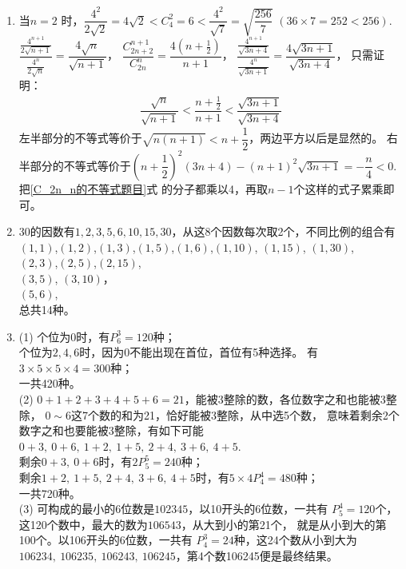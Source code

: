 \begin{enumerate}[label={\textbf{\arabic*.}},leftmargin=
    \inteval{\myenumleftmargin}pt]
\item 当$ n=2 $ 时，$ \dfrac{4^2}{2\sqrt{2}}=4\sqrt{2}<
C_4^2=6<\dfrac{4^2}{\sqrt{7}}=\sqrt{\dfrac{256}{7}} $\q 
$ (36\times 7=252<256) $. \\
$ \dfrac{\frac{4^{n+1}}{2\sqrt{n+1}}}
{\frac{4^{n}}{2\sqrt{n}}}=\dfrac{4\sqrt{n}}{\sqrt{n+1}} $，
$ \dfrac{C_{2n+2}^{n+1}}{C_{2n}^{n}}=
\dfrac{4(n+\frac{1}{2})}{n+1} $，
$ \dfrac{\frac{4^{n+1}}{\sqrt{3n+4}}}
{\frac{4^{n}}{\sqrt{3n+1}}}=\dfrac{4\sqrt{3n+1}}{\sqrt{3n+4}} $，
只需证明：
\begin{gather}\label{C_2n_n的不等式题目}
    \dfrac{\sqrt{n}}{\sqrt{n+1}}<\dfrac{n+\frac{1}{2}}{n+1}
    <\dfrac{\sqrt{3n+1}}{\sqrt{3n+4}}
\end{gather}
左半部分的不等式等价于$\sqrt{n(n+1)}<n+\dfrac{1}{2}$，两边平方以后是显然的。
右半部分的不等式等价于$ \left(n+\dfrac{1}{2}\right)^2(3n+4)-
(n+1)^2\sqrt{3n+1}=-\dfrac{n}{4}<0 $. 把\eqref{C_2n_n的不等式题目}式
的分子都乘以4，再取$n-1$个这样的式子累乘即可。

\item 30的因数有$ 1,2,3,5,6,10,15,30 $，从这8个因数每次取2个，不同比例的组合有\\
$ (1,1) $,$ (1,2) $,$ (1,3) $,$ (1,5) $,$ (1,6) $,$(1,10)$,
$ (1,15) $, $(1,30)$,\\
$ (2,3) $,$(2,5)$,$(2,15)$,\\
$ (3,5) $, $(3,10)$，\\
$ (5,6) $,\\
总共14种。

\item (1) 个位为0时，有$P_6^3=120$种；\\
个位为$2,4,6$时，因为0不能出现在首位，首位有5种选择。
有$ 3\times 5 \times 5 \times 4= 300 $种；\\
一共420种。\\
(2) $0+1+2+3+4+5+6=21$，能被3整除的数，各位数字之和也能被3整除，
$ 0\sim 6 $这7个数的和为21，恰好能被3整除，从中选5个数，
意味着剩余2个数字之和也要能被3整除，有如下可能
$ 0+3,\ 0+6,\ 1+2,\ 1+5,\ 2+4,\ 3+6,\ 4+5 $.\\
剩余$0+3,\ 0+6$时，有$2P_5^5=240$种；\\
剩余$1+2,\ 1+5,\ 2+4,\ 3+6,\ 4+5 $时，有$5\times4 P_4^4=480$种；\\
一共720种。\\
(3) 可构成的最小的6位数是$ 102345 $，以10开头的6位数，一共有
$P_5^4=120$个，这120个数中，最大的数为$106543$，从大到小的第21个，
就是从小到大的第100个。以106开头的6位数，一共有
$P_4^3=24 $种，这24个数从小到大为$106234,\ 106235,
\ 106243,\ 106245 $，第4个数106245便是最终结果。


\end{enumerate}
